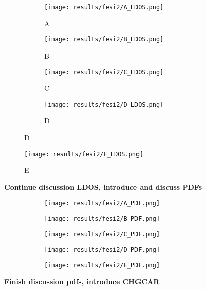\begin{figure}[H]
	\begin{subfigure}{\textwidth}
		\texttt{[image: results/fesi2/A\_LDOS.png]}
		\caption{A}
	\end{subfigure}
	\begin{subfigure}{\textwidth}
		\texttt{[image: results/fesi2/B\_LDOS.png]}
		\caption{B}
	\end{subfigure}
	\begin{subfigure}{\textwidth}
		\texttt{[image: results/fesi2/C\_LDOS.png]}
		\caption{C}
	\end{subfigure}
	\begin{subfigure}{\textwidth}
		\texttt{[image: results/fesi2/D\_LDOS.png]}
		\caption{D}
	\end{subfigure}
\end{figure}		
\begin{figure}[H]
	\texttt{[image: results/fesi2/E\_LDOS.png]}
	\caption{E}
\end{figure}

\textbf{Continue discussion LDOS, introduce and discuss PDFs}

\begin{figure}[H]
	\begin{subfigure}{\textwidth}
		\texttt{[image: results/fesi2/A\_PDF.png]}
	\end{subfigure}	
	\begin{subfigure}{\textwidth}
		\texttt{[image: results/fesi2/B\_PDF.png]}
	\end{subfigure}
	\begin{subfigure}{\textwidth}
		\texttt{[image: results/fesi2/C\_PDF.png]}
	\end{subfigure}
\end{figure}
\begin{figure}[H]
	\begin{subfigure}{\textwidth}
		\texttt{[image: results/fesi2/D\_PDF.png]}
	\end{subfigure}
	\begin{subfigure}{\textwidth}
		\texttt{[image: results/fesi2/E\_PDF.png]}
	\end{subfigure}
\end{figure}

\textbf{Finish discussion pdfs, introduce CHGCAR}

